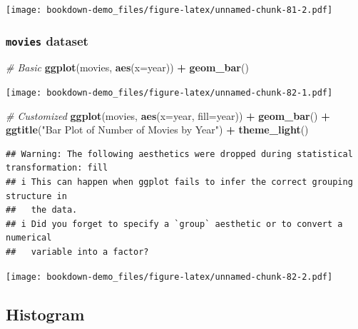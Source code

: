 \documentclass[
  b5paper]{book}
\newenvironment{Shaded}{\begin{snugshade}}{\end{snugshade}}
\newcommand{\AttributeTok}[1]{\textcolor[rgb]{0.13,0.29,0.53}{#1}}
\newcommand{\CommentTok}[1]{\textcolor[rgb]{0.56,0.35,0.01}{\textit{#1}}}
\newcommand{\FunctionTok}[1]{\textcolor[rgb]{0.13,0.29,0.53}{\textbf{#1}}}
\newcommand{\NormalTok}[1]{#1}
\newcommand{\SpecialCharTok}[1]{\textcolor[rgb]{0.81,0.36,0.00}{\textbf{#1}}}
\newcommand{\StringTok}[1]{\textcolor[rgb]{0.31,0.60,0.02}{#1}}
\begin{document}
\texttt{[image: bookdown-demo\_files/figure-latex/unnamed-chunk-81-2.pdf]}

\hypertarget{movies-dataset-3}{%
\subsubsection*{\texorpdfstring{\texttt{movies} dataset}{movies dataset}}\label{movies-dataset-3}}

\begin{Shaded}
\begin{Highlighting}[]
\CommentTok{\# Basic}
\FunctionTok{ggplot}\NormalTok{(movies, }\FunctionTok{aes}\NormalTok{(}\AttributeTok{x=}\NormalTok{year)) }\SpecialCharTok{+} \FunctionTok{geom\_bar}\NormalTok{()}
\end{Highlighting}
\end{Shaded}

\texttt{[image: bookdown-demo\_files/figure-latex/unnamed-chunk-82-1.pdf]}

\begin{Shaded}
\begin{Highlighting}[]
\CommentTok{\# Customized}
\FunctionTok{ggplot}\NormalTok{(movies, }\FunctionTok{aes}\NormalTok{(}\AttributeTok{x=}\NormalTok{year, }\AttributeTok{fill=}\NormalTok{year)) }\SpecialCharTok{+}
  \FunctionTok{geom\_bar}\NormalTok{() }\SpecialCharTok{+}
  \FunctionTok{ggtitle}\NormalTok{(}\StringTok{"Bar Plot of Number of Movies by Year"}\NormalTok{) }\SpecialCharTok{+}
  \FunctionTok{theme\_light}\NormalTok{()}
\end{Highlighting}
\end{Shaded}

\begin{verbatim}
## Warning: The following aesthetics were dropped during statistical transformation: fill
## i This can happen when ggplot fails to infer the correct grouping structure in
##   the data.
## i Did you forget to specify a `group` aesthetic or to convert a numerical
##   variable into a factor?
\end{verbatim}

\texttt{[image: bookdown-demo\_files/figure-latex/unnamed-chunk-82-2.pdf]}

\hypertarget{histogram}{%
\subsection*{Histogram}\label{histogram}}
\end{document}
